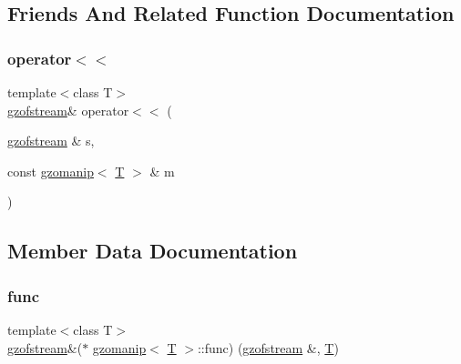\subsection{Friends And Related Function Documentation}
\mbox{\label{classgzomanip_ace1e67eb789a4d1577a12cfcf782f22e}} 
\subsubsection{\texorpdfstring{operator$<$$<$}{operator<<}}
{\footnotesize\ttfamily template$<$class T$>$ \\
\mbox{\hyperlink{classgzofstream}{gzofstream}}\& operator$<$$<$ (\begin{DoxyParamCaption}\item[{\mbox{\hyperlink{classgzofstream}{gzofstream}} \&}]{s,  }\item[{const \mbox{\hyperlink{classgzomanip}{gzomanip}}$<$ \mbox{\hyperlink{_aes_8c_af6f2f773ebe19973d2b24c1b959affe6}{T}} $>$ \&}]{m }\end{DoxyParamCaption})\hspace{0.3cm}{\ttfamily [friend]}}



\subsection{Member Data Documentation}
\mbox{\label{classgzomanip_acab3baeb360166d1af5ecf0345c15280}} 
\subsubsection{\texorpdfstring{func}{func}}
{\footnotesize\ttfamily template$<$class T$>$ \\
\mbox{\hyperlink{classgzofstream}{gzofstream}}\&($\ast$ \mbox{\hyperlink{classgzomanip}{gzomanip}}$<$ \mbox{\hyperlink{_aes_8c_af6f2f773ebe19973d2b24c1b959affe6}{T}} $>$\+::func) (\mbox{\hyperlink{classgzofstream}{gzofstream}} \&, \mbox{\hyperlink{_aes_8c_af6f2f773ebe19973d2b24c1b959affe6}{T}})\hspace{0.3cm}{\ttfamily [private]}}

\mbox{\label{classgzomanip_aaf32d81ce390ca216d9c5df35cbc66d5}} 
